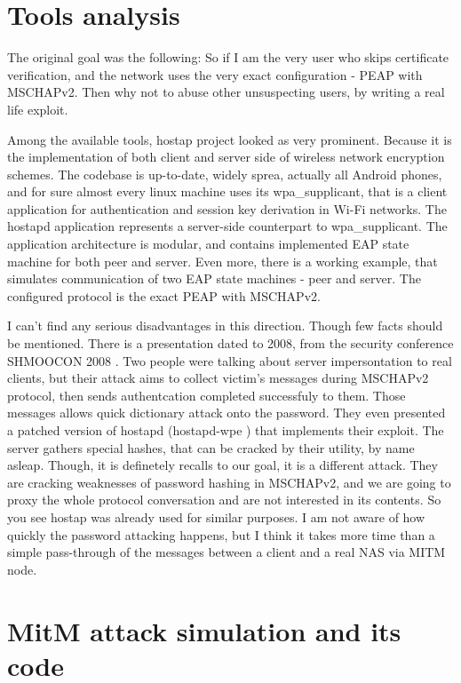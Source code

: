 \documentclass{extarticle}
\begin{document}
\section{Tools analysis}

The original goal was the following:
So if I am the very user who skips certificate verification,
and the network uses the very exact configuration - PEAP with MSCHAPv2.
Then why not to abuse other unsuspecting users,
by writing a real life exploit.

Among the available tools,
hostap project \cite{hostap-w1fi} looked as very prominent.
Because it is the implementation of both client and server side
of wireless network encryption schemes.
The codebase is up-to-date, widely sprea,
actually all Android phones, and for sure almost every linux machine
uses its wpa\_supplicant, that is a client application for authentication
and session key derivation in Wi-Fi networks.
The hostapd application represents a server-side counterpart
to wpa\_supplicant.
The application architecture is modular, and contains implemented EAP state machine
for both peer and server.
Even more, there is a working example, that simulates communication
of two EAP state machines - peer and server. The configured protocol
is the exact PEAP with MSCHAPv2.

I can't find any serious disadvantages in this direction.
Though few facts should be mentioned.
There is a presentation dated to 2008,
from the security conference SHMOOCON 2008 \cite{whfs-peap-shmoocon-2008}.
Two people were talking about server impersontation
to real clients,
but their attack aims to collect
victim's messages during MSCHAPv2 protocol,
then sends authentcation completed successfuly to them.
Those messages allows quick dictionary attack onto the password.
They even presented a patched version of hostapd (hostapd-wpe \cite{hostapd-wpe})
that implements their exploit.
The server gathers special hashes,
that can be cracked by their utility, by name asleap.
Though, it is definetely recalls to our goal,
it is a different attack.
They are cracking weaknesses of password hashing in MSCHAPv2,
and we are going to proxy the whole protocol conversation
and are not interested in its contents.
So you see hostap was already used for similar purposes.
I am not aware of how quickly the password attacking happens,
but I think it takes more time than a simple pass-through of the messages
between a client and a real NAS via MITM node.

\section{MitM attack simulation and its code}
\end{document}
